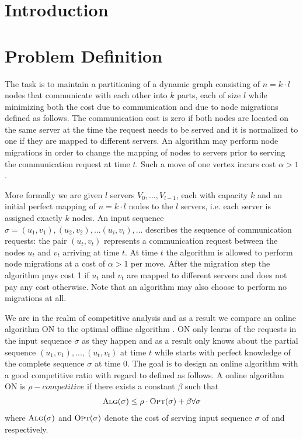 \documentclass[xcolor=dvipsnames, tikz, 12pt]{article}
\newcommand{\nl}{\newline}
\newcommand{\opt}{\text{O{\scriptsize PT}}}
\newcommand{\alg}{\text{A{\scriptsize LG}}}
\theoremstyle{definition}
\begin{document}
{
	\hypersetup{linkcolor=black}
	\tableofcontents
	\clearpage
}


\section{Introduction}
	
	
	\section{Problem Definition}
	The task is to maintain a partitioning of a dynamic graph consisting of $n=k\cdot l$ nodes that communicate with each other into $k$ parts, each of size $l$ while minimizing both the cost due to communication and due to node migrations defined as follows. The communication cost is zero if both nodes are located on the same server at the time the request needs to be served and it is normalized to one if they are mapped to different servers. An algorithm may perform node migrations in order to change the mapping of nodes to servers prior to serving the communication request at time $t$. Such a move of one vertex incurs cost $\alpha>1$.
	
	More formally we are given $l$ servers $V_0,...,V_{l-1}$, each with capacity $k$ and an initial perfect mapping of $n=k\cdot l$ nodes to the $l$ servers, i.e. each server is assigned exactly $k$ nodes. An input sequence $\sigma=(u_1, v_1), (u_2, v_2),...(u_i,v_i),...$ describes the sequence of communication requests: the pair $(u_t, v_t)$ represents a communication request between the nodes $u_t$ and $v_t$ arriving at time $t$. At time $t$ the algorithm is allowed to perform node migrations at a cost of $\alpha>1$ per move. After the migration step the algorithm pays cost 1 if $u_t$ and $v_t$ are mapped to different servers and does not pay any cost otherwise. Note that an algorithm may also choose to perform no migrations at all.
	
	We are in the realm of competitive analysis and as a result we compare an online algorithm ON to the optimal offline algorithm \opt{}. ON only learns of the requests in the input sequence $\sigma$ as they happen and as a result only knows about the partial sequence $(u_1,v_1),...,(u_t,v_t)$ at time $t$ while \opt{} starts with perfect knowledge of the complete sequence $\sigma$ at time $0$.\nl
	The goal is to design an online algorithm \alg{} with a good competitive ratio with regard to \opt{} defined as follows.\nl
	A online algorithm ON is $\rho-competitive$ if there exists a constant $\beta$ such that \begin{align*}
	\alg{}(\sigma)\leq\rho\cdot \opt{}(\sigma)+\beta\forall \sigma
	\end{align*} 
	where $\alg{}(\sigma)$ and $\opt{}(\sigma)$ denote the cost of serving input sequence $\sigma$ of \alg{} and \opt{} respectively.
	
\end{document}
